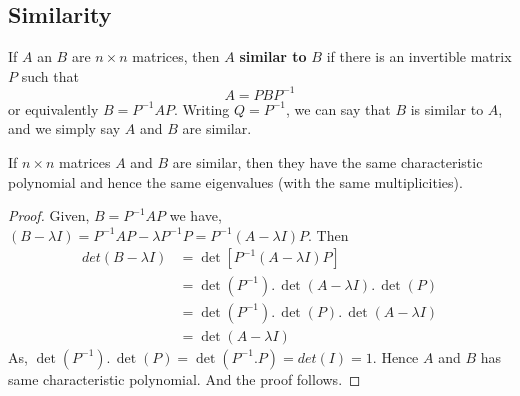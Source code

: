\documentclass[aima104_lecturenotes_ku.tex]{subfiles}
\begin{document}
\subsection{Similarity}
If $A$ an $B$ are $n \times n$ matrices, then $A$ \textbf{similar to} $B$ if there is an invertible matrix $P$ such that $$A = PBP^{-1}$$ or equivalently $B=P^{-1}AP$. Writing $Q=P^{-1}$, we can say that $B$ is similar to $A$, and we simply say $A$ and $B$ are similar.
\begin{theorem}
  If $n \times n$ matrices $A$ and $B$ are similar, then they have the same characteristic polynomial and hence the same eigenvalues (with the same multiplicities).
\end{theorem}
\begin{proof}
 \hspace{1cm} Given, $B=P^{-1}AP$ we have, $(B-\lambda I) = P^{-1}AP - \lambda P^{-1}P = P^{-1}(A- \lambda I) P$. Then
    \begin{align*}
      det(B-\lambda I) &= \det[P^{-1}(A- \lambda I) P] \\
                       &= \det(P^{-1}).\, \det(A- \lambda I).\, \det(P) \\
                       &= \det(P^{-1}).\, \det(P). \, \det(A- \lambda I) \\
                       &= \det(A- \lambda I)
    \end{align*}
  As, $\det(P^{-1}).\, \det(P) = \det(P^{-1}.P)=det(I) = 1$. Hence $A$ and $B$ has same characteristic polynomial. And the proof follows.
\end{proof}
\end{document}
